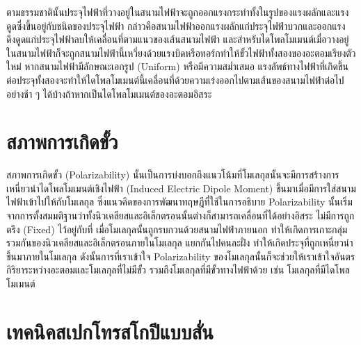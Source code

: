 ตามธรรมชาตินั้นประจุไฟฟ้าที่วางอยู่ในสนามไฟฟ้าจะถูกออกแรงกระทำทั้งในรูปของแรงผลักและแรงดูดซึ่งขึ้นอยู่กับชนิดของประจุไฟฟ้า กล่าวคือสนามไฟฟ้าออกแรงผลักแก่ประจุไฟฟ้าบวกและออกแรงดึงดูดแก่ประจุไฟฟ้าลบให้เคลื่อนที่ตามแนวของเส้นสนามไฟฟ้า และสําหรับไดโพลโมเมนต์เมื่อวางอยู่ในสนามไฟฟ้าก็จะถูกสนามไฟฟ้านี้เหวี่ยงด้วยแรงบิดหรือทอร์กทําให้ขั้วไฟฟ้าทั้งสองของอะตอมเรียงตัวใหม่ หากสนามไฟฟ้ามีลักษณะเอกรูป (Uniform) หรือมีความสม่ำเสมอ แรงลัพธ์ทางไฟฟ้าที่เกิดขึ้นต่อประจุทั้งสองจะทําให้ไดโพลโมเมนต์นี้เคลื่อนที่ด้วยความเร่งออกไปตามเส้นของสนามไฟฟ้าต่อไปอย่างช้า ๆ ได้บ้างถ้าหากเป็นไดโพลโมเมนต์ของอะตอมอิสระ

\section{สภาพการเกิดขั้ว}
\label{sec:polariz}

สภาพการเกิดขั้ว (Polarizability) นั้นเป็นการบ่งบอกถึงแนวโน้มที่โมเลกุลนั้นจะมีการสร้างการเหนี่ยวนำไดโพลโมเมนต์เชิงไฟฟ้า (Induced Electric Dipole Moment) ขึ้นมาเมื่อมีการใส่สนามไฟฟ้าเข้าไปให้กับโมเลกุล ซึ่งแนวคิดของการพัฒนาทฤษฎีที่ใช้ในการอธิบาย Polarizability นั้นเริ่มจากการตั้งสมมติฐานว่าทั้งนิวเคลียสและอิเล็กตรอนนั้นต่างก็สามารถเคลื่อนที่ได้อย่างอิสระ ไม่มีการถูกตรึง (Fixed) ไว้อยู่กับที่ เมื่อโมเลกุลนั้นถูกรบกวนด้วยสนามไฟฟ้าภายนอก ทำให้เกิดการเกาะกลุ่มรวมกันของนิวเคลียสและอิเล็กตรอนภายในโมเลกุล แยกกันไปคนละฝั่ง ทำให้เกิดประจุที่ถูกเหนี่ยวนำขึ้นมาภายในโมเลกุล ดังนั้นการที่เราเข้าใจ Polarizability ของโมเลกุลนั้นก็จะช่วยให้เราเข้าใจอันตรกิริยาระหว่างอะตอมและโมเลกุลที่ไม่มีขั้ว รวมถึงโมเลกุลที่มีขั้วทางไฟฟ้าด้วย เช่น โมเลกุลที่มีไดโพลโมเมนต์

\section{เทคนิคสเปกโทรสโกปีแบบสั่น}
\label{sec:spectro}

